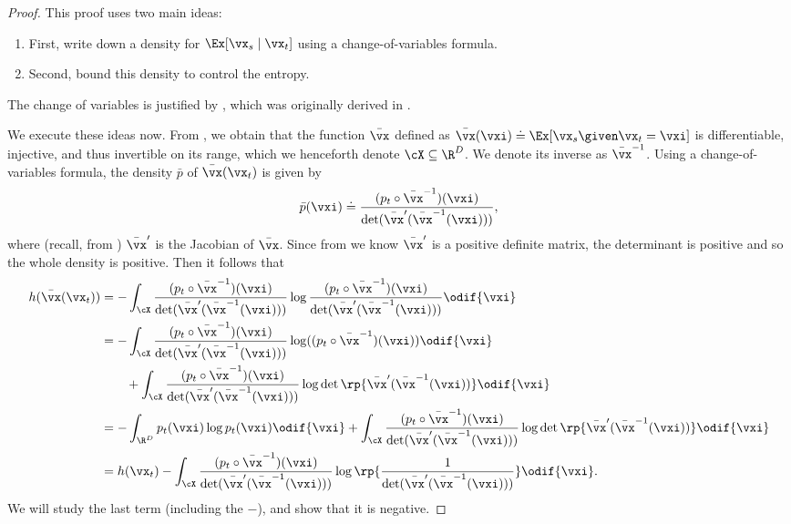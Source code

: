 \documentclass[../../book-main.tex]{subfiles}
\begin{document}
\begin{proof}
    This proof uses two main ideas:
    \begin{enumerate}
        \item First, write down a density for \(\Ex[\vx_{s} \mid
            \vx_{t}]\) using a change-of-variables formula.
        \item Second, bound this density to control the entropy.
    \end{enumerate}
    The change of variables is justified by ,
    which was originally derived in \cite{Gribonval2011-pf}.

    We execute these ideas now. From , we
    obtain that the function \(\bar{\vx}\) defined as
    \(\bar{\vx}(\vxi) \doteq \Ex[\vx_{s} \given \vx_{t} = \vxi]\) is
    differentiable, injective, and thus invertible on its range,
    which we henceforth denote \(\cX \subseteq \R^{D}\). We denote
    its inverse as \(\bar{\vx}^{-1}\). Using a change-of-variables
    formula, the density \(\bar{p}\) of \(\bar{\vx}(\vx_{t})\) is given by
    \begin{equation}
        \bar{p}(\vxi) \doteq \frac{(p_{t} \circ
        \bar{\vx}^{-1})(\vxi)}{\det(\bar{\vx}^{\prime}(\bar{\vx}^{-1}(\vxi)))},
    \end{equation}
    where (recall, from ) \(\bar{\vx}^{\prime}\)
    is the Jacobian of \(\bar{\vx}\). Since from
     we know \(\bar{\vx}^{\prime}\) is a
    positive definite matrix, the determinant is positive and so the
    whole density is positive. Then it follows that
    \begin{align}
        h(\bar{\vx}(\vx_{t}))
        &= -\int_{\cX}\frac{(p_{t} \circ
        \bar{\vx}^{-1})(\vxi)}{\det(\bar{\vx}^{\prime}(\bar{\vx}^{-1}(\vxi)))}
        \log \frac{(p_{t} \circ
        \bar{\vx}^{-1})(\vxi)}{\det(\bar{\vx}^{\prime}(\bar{\vx}^{-1}(\vxi)))}
        \odif{\vxi} \\
        &= -\int_{\cX}\frac{(p_{t} \circ
        \bar{\vx}^{-1})(\vxi)}{\det(\bar{\vx}^{\prime}(\bar{\vx}^{-1}(\vxi)))}
        \log((p_{t} \circ \bar{\vx}^{-1})(\vxi))\odif{\vxi} \\
        &\qquad + \int_{\cX}\frac{(p_{t} \circ
        \bar{\vx}^{-1})(\vxi)}{\det(\bar{\vx}^{\prime}(\bar{\vx}^{-1}(\vxi)))}\log\det\rp{\bar{\vx}^{\prime}(\bar{\vx}^{-1}(\vxi))}\odif{\vxi}
        \\
        &= -\int_{\R^{D}}p_{t}(\vxi)\log p_{t}(\vxi)\odif{\vxi}
        + \int_{\cX}\frac{(p_{t} \circ
        \bar{\vx}^{-1})(\vxi)}{\det(\bar{\vx}^{\prime}(\bar{\vx}^{-1}(\vxi)))}\log\det\rp{\bar{\vx}^{\prime}(\bar{\vx}^{-1}(\vxi))}\odif{\vxi}
        \\
        &= h(\vx_{t}) - \int_{\cX}\frac{(p_{t} \circ
        \bar{\vx}^{-1})(\vxi)}{\det(\bar{\vx}^{\prime}(\bar{\vx}^{-1}(\vxi)))}\log\rp{\frac{1}{\det(\bar{\vx}^{\prime}(\bar{\vx}^{-1}(\vxi)))}}\odif{\vxi}.
    \end{align}
    We will study the last term (including the \(-\)), and show that
    it is negative.


\end{proof}
\end{document}
